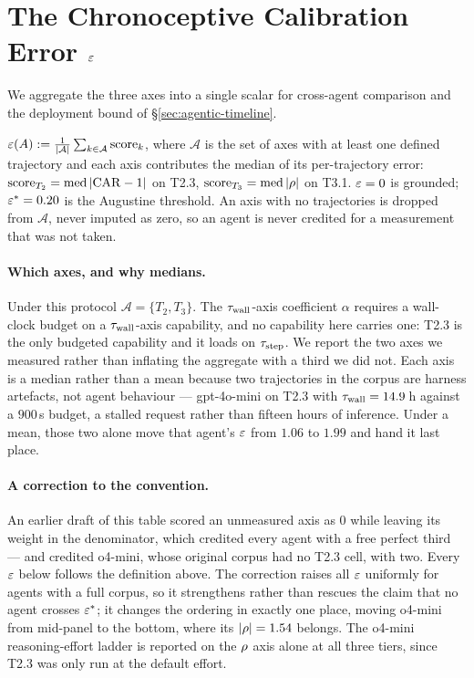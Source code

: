 
\section{The Chronoceptive Calibration Error $\varepsilon$}
\label{sec:epsilon}

We aggregate the three axes into a single scalar for cross-agent comparison and the deployment bound of \S\ref{sec:agentic-timeline}.

\begin{definition}
\label{def:cce}
$\varepsilon(A) := \frac{1}{|\mathcal{A}|}\sum_{k \in \mathcal{A}} \mathrm{score}_k$, where $\mathcal{A}$ is the set of axes with at least one defined trajectory and each axis contributes the median of its per-trajectory error: $\mathrm{score}_{T_2} = \mathrm{med}\,|\mathrm{CAR} - 1|$ on T2.3, $\mathrm{score}_{T_3} = \mathrm{med}\,|\rho|$ on T3.1. $\varepsilon = 0$ is grounded; $\varepsilon^{*} = 0.20$ is the Augustine threshold. An axis with no trajectories is dropped from $\mathcal{A}$, never imputed as zero, so an agent is never credited for a measurement that was not taken.
\end{definition}

\paragraph{Which axes, and why medians.} Under this protocol $\mathcal{A} = \{T_2, T_3\}$. The $\tau_{\mathrm{wall}}$-axis coefficient $\alpha$ requires a wall-clock budget on a $\tau_{\mathrm{wall}}$-axis capability, and no capability here carries one: T2.3 is the only budgeted capability and it loads on $\tau_{\mathrm{step}}$. We report the two axes we measured rather than inflating the aggregate with a third we did not. Each axis is a median rather than a mean because two trajectories in the corpus are harness artefacts, not agent behaviour --- gpt-4o-mini on T2.3 with $\tau_{\mathrm{wall}} = 14.9$\,h against a $900$\,s budget, a stalled request rather than fifteen hours of inference. Under a mean, those two alone move that agent's $\varepsilon$ from $1.06$ to $1.99$ and hand it last place.

\paragraph{A correction to the convention.} An earlier draft of this table scored an unmeasured axis as $0$ while leaving its weight in the denominator, which credited every agent with a free perfect third --- and credited o4-mini, whose original corpus had no T2.3 cell, with two. Every $\varepsilon$ below follows the definition above. The correction raises all $\varepsilon$ uniformly for agents with a full corpus, so it strengthens rather than rescues the claim that no agent crosses $\varepsilon^{*}$; it changes the ordering in exactly one place, moving o4-mini from mid-panel to the bottom, where its $|\rho| = 1.54$ belongs. The o4-mini reasoning-effort ladder is reported on the $\rho$ axis alone at all three tiers, since T2.3 was only run at the default effort.

